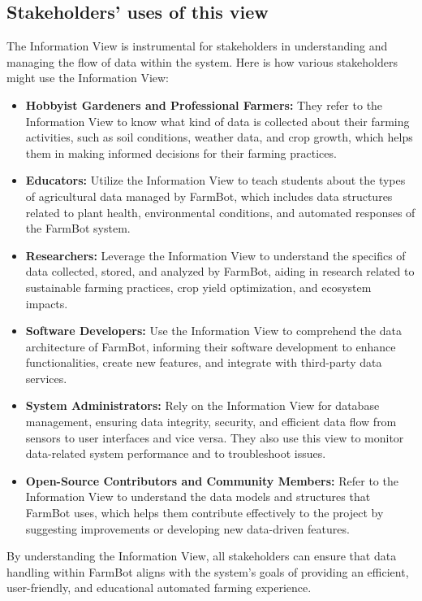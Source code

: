 \subsection{Stakeholders’ uses of this view}
The Information View is instrumental for stakeholders in understanding and managing the flow of data within the system. Here is how various stakeholders might use the Information View:
\begin{itemize}
    \item \textbf{Hobbyist Gardeners and Professional Farmers:} They refer to the Information View to know what kind of data is collected about their farming activities, such as soil conditions, weather data, and crop growth, which helps them in making informed decisions for their farming practices.
    \item \textbf{Educators:} Utilize the Information View to teach students about the types of agricultural data managed by FarmBot, which includes data structures related to plant health, environmental conditions, and automated responses of the FarmBot system.
    \item \textbf{Researchers:} Leverage the Information View to understand the specifics of data collected, stored, and analyzed by FarmBot, aiding in research related to sustainable farming practices, crop yield optimization, and ecosystem impacts.
    \item \textbf{Software Developers:} Use the Information View to comprehend the data architecture of FarmBot, informing their software development to enhance functionalities, create new features, and integrate with third-party data services.
    \item \textbf{System Administrators:} Rely on the Information View for database management, ensuring data integrity, security, and efficient data flow from sensors to user interfaces and vice versa. They also use this view to monitor data-related system performance and to troubleshoot issues.
    \item \textbf{Open-Source Contributors and Community Members:} Refer to the Information View to understand the data models and structures that FarmBot uses, which helps them contribute effectively to the project by suggesting improvements or developing new data-driven features.
\end{itemize}
By understanding the Information View, all stakeholders can ensure that data handling within FarmBot aligns with the system's goals of providing an efficient, user-friendly, and educational automated farming experience.


